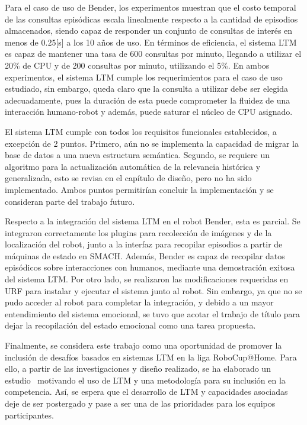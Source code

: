 \begin{conclusion}
Para el caso de uso de Bender, los experimentos muestran que el costo temporal de las consultas episódicas escala linealmente respecto a la cantidad de episodios almacenados, siendo capaz de responder un conjunto de consultas de interés en menos de 0.25[s] a los 10 años de uso. En términos de eficiencia, el sistema LTM es capaz de mantener una tasa de 600 consultas por minuto, llegando a utilizar el 20\% de CPU y de 200 consultas por minuto, utilizando el 5\%. En ambos experimentos, el sistema LTM cumple los requerimientos para el caso de uso estudiado, sin embargo, queda claro que la consulta a utilizar debe ser elegida adecuadamente, pues la duración de esta puede comprometer la fluidez de una interacción humano-robot y además, puede saturar el núcleo de CPU asignado.

El sistema LTM cumple con todos los requisitos funcionales establecidos, a excepción de 2 puntos. Primero, aún no se implementa la capacidad de migrar la base de datos a una nueva estructura semántica. Segundo, se requiere un algoritmo para la actualización automática de la relevancia histórica y generalizada, esto se revisa en el capítulo de diseño, pero no ha sido implementado. Ambos puntos permitirían concluir la implementación y se consideran parte del trabajo futuro.

Respecto a la integración del sistema LTM en el robot Bender, esta es parcial. Se integraron correctamente los plugins para recolección de imágenes y de la localización del robot, junto a la interfaz para recopilar episodios a partir de máquinas de estado en SMACH. Además, Bender es capaz de recopilar datos episódicos sobre interacciones con humanos, mediante una demostración exitosa del sistema LTM. Por otro lado, se realizaron las modificaciones requeridas en URF para instalar y ejecutar el sistema junto al robot. Sin embargo, ya que no se pudo acceder al robot para completar la integración, y debido a un mayor entendimiento del sistema emocional, se tuvo que acotar el trabajo de título para dejar la recopilación del estado emocional como una tarea propuesta.

Finalmente, se considera este trabajo como una oportunidad de promover la inclusión de desafíos basados en sistemas LTM en la liga RoboCup@Home. Para ello, a partir de las investigaciones y diseño realizado, se ha elaborado un estudio~\cite{ltm_in_robocup} motivando el uso de LTM y una metodología para su inclusión en la competencia. Así, se espera que el desarrollo de LTM y capacidades asociadas deje de ser postergado y pase a ser una de las prioridades para los equipos participantes.



\end{conclusion}
